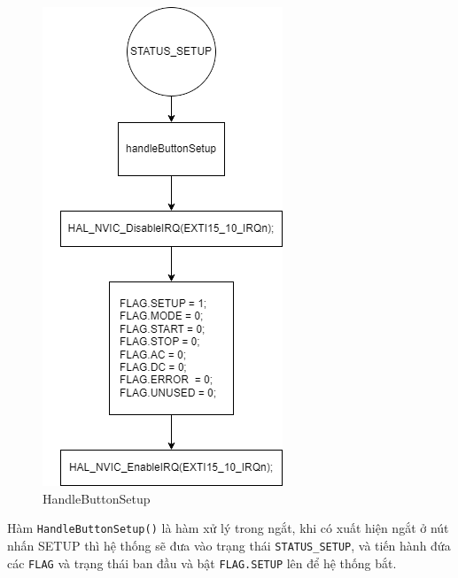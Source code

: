 \begin{figure}[H]
	\centering
	\includegraphics[width=0.5\linewidth]{./diagram/handleButtonSetup.png}
	\caption{HandleButtonSetup}
	\label{f_handlebuttonsetup}
\end{figure}

Hàm \texttt{HandleButtonSetup()} là hàm xử lý trong ngắt, khi có xuất hiện ngắt ở nút nhấn SETUP thì hệ thống sẽ đưa vào trạng thái \texttt{STATUS\_SETUP}, và tiến hành đứa các \texttt{FLAG} và trạng thái ban đầu và bật \texttt{FLAG.SETUP} lên để hệ thống bắt.

